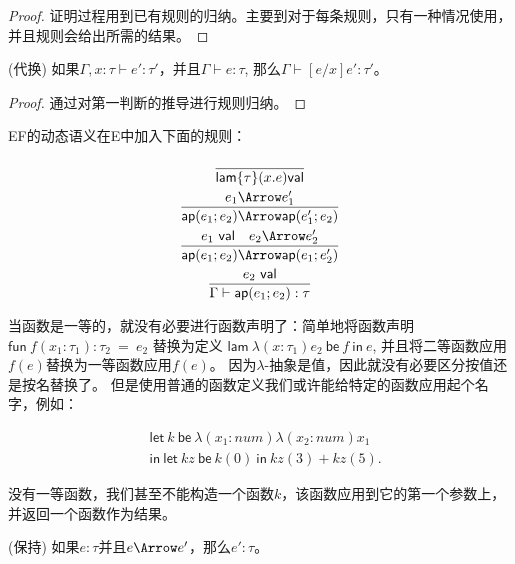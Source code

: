 \begin{proof}
证明过程用到已有规则的归纳。主要到对于每条规则，只有一种情况使用，并且规则会给出所需的结果。
\end{proof}

\begin{lemma}(代换)
 如果$\Gamma,x:\tau \vdash e':\tau'$，并且$\Gamma \vdash e:\tau$,
 那么$\Gamma \vdash [e/x]e':\tau'$。
\end{lemma}

\begin{proof}
通过对第一判断的推导进行规则归纳。
\end{proof}

EF的动态语义在E中加入下面的规则：

\begin{subequations}
    \begin{gather}
        \dfrac{}
            {\mathsf{lam}\{\tau\}(x.e)\mathsf{val}} \\
        \dfrac{e_1 \Arrow e'_1}
            {\mathsf{ap}(e_1;e_2) \Arrow \mathsf{ap}(e'_1;e_2)} \\
        \dfrac{ e_1\ \mathsf{val} \quad e_2 \Arrow e'_2 }
            {\mathsf{ap}(e_1;e_2) \Arrow \mathsf{ap}( e_1;e'_2 )} \\
        \dfrac{ e_2\ \mathsf{val} }
            {\Gamma \vdash \mathsf{ap}(e_1;e_2):\tau}
    \end{gather}
\end{subequations}

当函数是一等的，就没有必要进行函数声明了：简单地将函数声明
$\mathsf{fun}\ f(x_1:\tau_1):\tau_2\ =\ e_2$
替换为定义
$\mathsf{lam}\ \lambda(x:\tau_1)e_2\ \mathsf{be}\ f\ \mathsf{in}\ e$,
并且将二等函数应用$f(e)$替换为一等函数应用$f(e)$。
因为$\lambda$-抽象是值，因此就没有必要区分按值还是按名替换了。
但是使用普通的函数定义我们或许能给特定的函数应用起个名字，例如：

\[
\begin{aligned}
&\mathsf{let}\ k\ \mathsf{be}\ \lambda(x_1:num)\lambda(x_2:num)x_1      \\ 
&\mathsf{in\ let}\ kz\ \mathsf{be}\ k(0)\ \mathsf{in}\ kz(3)+kz(5).
\end{aligned}
\]

没有一等函数，我们甚至不能构造一个函数$k$，该函数应用到它的第一个参数上，
并返回一个函数作为结果。

\begin{theorem}{(保持)}
如果$e:\tau$并且$e \Arrow e'$，那么$e':\tau$。
\end{theorem}

